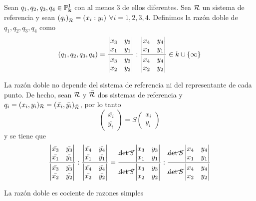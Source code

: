 \begin{defi}
  Sean $q_1, q_2, q_3, q_4 \in \mathbb{P}^1_{\mathbf{k}}$ con al menos 3 de ellos diferentes. Sea
  $\mathcal{R}$ un sistema de referencia y sean $\left( q_i \right)_{\mathcal{R}} = (x_i:y_i)$
  $\forall i=1,2,3,4$. Definimos la razón doble de $q_1,q_2,q_3,q_4$ como
  \[
    \left( q_1,q_2,q_3,q_4 \right) = \frac{\begin{vmatrix}x_3 & y_3 \\ x_1 & y_1\end{vmatrix}}
    {\begin{vmatrix}x_3 & y_3 \\ x_2 & y_2\end{vmatrix}}:\frac{\begin{vmatrix}x_4 & y_4 \\ x_1 & y_1\end{vmatrix}}
    {\begin{vmatrix}x_4 & y_4 \\ x_2 & y_2\end{vmatrix}} \in k \cup \left\{\infty\right\}
  \]
\end{defi}
\begin{obs}
  La razón doble no depende del sistema de referencia ni del representante
  de cada punto. De hecho, sean $\mathcal{R}$ y $\bar{\mathcal{R}}$ dos sistemas de referencia
  y $q_i = (x_i, y_i)_{\mathcal{R}} = (\bar{x_i}, \bar{y_i})_{\bar{\mathcal{R}}}$, por lo tanto
  \[
    \begin{pmatrix} \bar{x_i} \\ \bar{y_i} \end{pmatrix} = S \begin{pmatrix}
      x_i \\ y_i \end{pmatrix}
  \]
  y se tiene que
  \[
    \frac{\begin{vmatrix}\bar{x_3} & \bar{y_3} \\ \bar{x_1} & \bar{y_1}\end{vmatrix}}
    {\begin{vmatrix}\bar{x_3} & \bar{y_3} \\ \bar{x_2} & \bar{y_2}\end{vmatrix}}:
    \frac{\begin{vmatrix}\bar{x_4} & \bar{y_4} \\ \bar{x_1} & \bar{y_1}\end{vmatrix}}
    {\begin{vmatrix}\bar{x_4} & \bar{y_4} \\ \bar{x_2} & \bar{y_2}\end{vmatrix}}
    = 
    \frac{\cancel{\det S}\begin{vmatrix}x_3 & y_3 \\ x_1 & y_1\end{vmatrix}}
    {\cancel{\det S} \begin{vmatrix}x_3 & y_3 \\ x_2 & y_2\end{vmatrix}}:
    \frac{\cancel{\det S} \begin{vmatrix}x_4 & y_4 \\ x_1 & y_1\end{vmatrix}}
    {\cancel{\det S} \begin{vmatrix}x_4 & y_4 \\ x_2 & y_2\end{vmatrix}}
  \]
\end{obs}
\begin{obs}
  La razón doble es cociente de razones simples
\end{obs}

